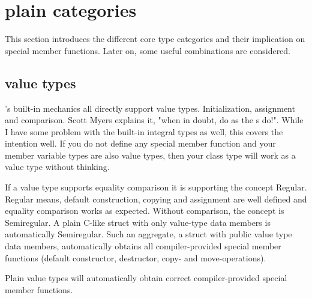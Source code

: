 \documentclass[ebook,11pt,article]{memoir}
\begin{document}
\section{plain categories}
This section introduces the different core type categories and their implication on special member functions. Later on, some useful combinations are considered.
\subsection{value types}
\Cpp{}'s built-in mechanics all directly support value types. Initialization, assignment and comparison. Scott Myers explains it, "when in doubt, do as the s do!". While I have some problem with the built-in integral types as well, this covers the intention well. If you do not define any special member function and your member variable types are also value types, then your class type will work as a value type without thinking.

If a value type supports equality comparison it is supporting the concept Regular. Regular means, default construction, copying and assignment are well defined and equality comparison works as expected. Without comparison, the concept is Semiregular.  A plain C-like struct with only value-type data members is automatically Semiregular.
Such an aggregate, a struct with public value type data members, automatically obtains all compiler-provided special member functions (default constructor, destructor, copy- and move-operations).

Plain value types will automatically obtain correct compiler-provided special member functions.
\end{document}
